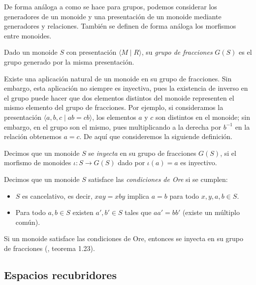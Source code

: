 \documentclass[TFG.tex]{subfiles}
\begin{document}
De forma análoga a como se hace para grupos, podemos considerar los generadores de un monoide y una presentación de un monoide mediante generadores y relaciones. También se definen de forma análoga los morfismos entre monoides. 

\begin{defi}
Dado un monoide $S$ con presentación $\langle M\mid R\rangle$, su \emph{grupo de fracciones} $G(S)$ es el grupo generado por la misma presentación.
\end{defi}

Existe una aplicación natural de un monoide en su grupo de fracciones. Sin embargo, esta aplicación no siempre es inyectiva, pues la existencia de inverso en el grupo puede hacer que dos elementos distintos del monoide representen el mismo elemento del grupo de fracciones. Por ejemplo, si consideramos la presentación $\langle a,b,c\mid ab=cb\rangle$, los elementos $a$ y $c$ son distintos en el monoide; sin embargo, en el grupo son el mismo, pues multiplicando a la derecha por $b^{-1}$ en la relación obtenemos $a=c$. De aquí que consideremos la siguiende definición.

\begin{defi}
Decimos que un monoide $S$ se \emph{inyecta} en su grupo de fracciones $G(S)$, si el morfismo de monoides $\iota: S\to G(S)$ dado por $\iota(a)=a$ es inyectivo.
\end{defi}
\newpage
\begin{defi}\label{condiciones}
Decimos que un monoide $S$ satisface las \emph{condiciones de Ore} \cite{Ore} si se cumplen:
\begin{itemize}
\item $S$ es cancelativo, es decir, $xay=xby$ implica $a=b$ para todo $x,y,a,b\in S$. 
\item Para todo $a,b\in S$ existen $a',b'\in S$ tales que $aa'=bb'$ (existe un múltiplo común). 
\end{itemize}
\end{defi}

\begin{prop}
Si un monoide satisface las condiciones de Ore, entonces se inyecta en su grupo de fracciones (\cite{Clifford}, teorema 1.23).
\end{prop}



\subsection{Espacios recubridores}
\end{document}
